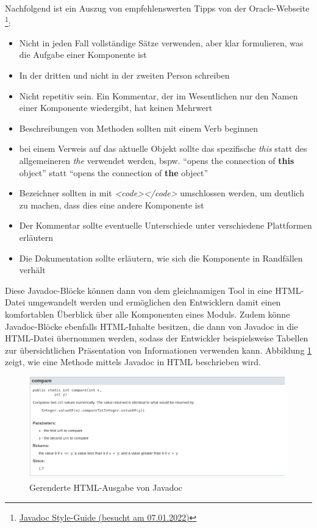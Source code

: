 Nachfolgend ist ein Auszug von empfehlenswerten Tipps von der Oracle-Webseite \footnote{\href{https://www.oracle.com/technical-resources/articles/java/javadoc-tool.html}{Javadoc Style-Guide (besucht am 07.01.2022)} }:
\begin{itemize}
    \item Nicht in jeden Fall vollständige Sätze verwenden, aber klar formulieren, was die Aufgabe einer Komponente ist
    \item In der dritten und nicht in der zweiten Person schreiben
    \item Nicht repetitiv sein. Ein Kommentar, der im Wesentlichen nur den Namen einer Komponente wiedergibt, hat keinen Mehrwert
    \item  Beschreibungen von Methoden sollten mit einem Verb beginnen
    \item bei einem Verweis auf das aktuelle Objekt sollte das spezifische \textit{this} statt des allgemeineren \textit{the} verwendet werden, bspw. \enquote{opens the connection of \textbf{this} object} statt \enquote{opens the connection of \textbf{the} object}
    \item Bezeichner sollten in mit \textit{<code></code>} umschlossen werden, um deutlich zu machen, dass dies eine andere Komponente ist
    \item Der Kommentar sollte eventuelle Unterschiede unter verschiedene Plattformen erläutern
    \item Die Dokumentation sollte erläutern, wie sich die Komponente in Randfällen verhält
    
\end{itemize}
Diese Javadoc-Blöcke können dann von dem gleichnamigen Tool in eine HTML-Datei umgewandelt werden und ermöglichen den Entwicklern damit einen komfortablen Überblick über alle Komponenten eines Moduls. Zudem könne Javadoc-Blöcke ebenfalls HTML-Inhalte besitzen, die dann von Javadoc in die HTML-Datei übernommen werden, sodass der Entwickler beispielsweise Tabellen zur übersichtlichen Präsentation  von Informationen verwenden kann. Abbildung \ref{fig:javadoc_example_screenshot} zeigt, wie eine Methode mittels Javadoc in HTML beschrieben wird. 
\begin{figure}[h]
    \centering
    \includegraphics[width=\columnwidth]{figures/javadoc_screenshot.png}
    \caption{Gerenderte HTML-Ausgabe von Javadoc}
    \label{fig:javadoc_example_screenshot}
\end{figure}

